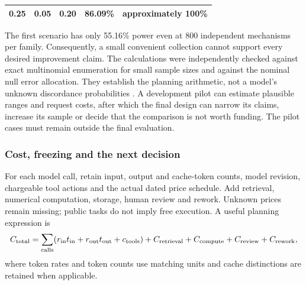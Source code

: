 \begin{longtable}[]{@{}lllll@{}}
\begin{minipage}[t]{0.17\columnwidth}\raggedright
0.25\strut
\end{minipage} & \begin{minipage}[t]{0.17\columnwidth}\raggedright
0.05\strut
\end{minipage} & \begin{minipage}[t]{0.17\columnwidth}\raggedright
0.20\strut
\end{minipage} & \begin{minipage}[t]{0.17\columnwidth}\raggedright
86.09\%\strut
\end{minipage} & \begin{minipage}[t]{0.17\columnwidth}\raggedright
approximately 100\%\strut
\end{minipage}\tabularnewline
\bottomrule
\end{longtable}

The first scenario has only 55.16\% power even at 800 independent
mechanisms per family. Consequently, a small convenient collection
cannot support every desired improvement claim. The calculations were
independently checked against exact multinomial enumeration for small
sample sizes and against the nominal null error allocation. They
establish the planning arithmetic, not a model's unknown discordance
probabilities \citep{exec13_live_planning}. A development pilot can
estimate plausible ranges and request costs, after which the final
design can narrow its claims, increase its sample or decide that the
comparison is not worth funding. The pilot cases must remain outside the
final evaluation.

\hypertarget{cost-freezing-and-the-next-decision}{%
\subsubsection{Cost, freezing and the next
decision}\label{cost-freezing-and-the-next-decision}}

For each model call, retain input, output and cache-token counts, model
revision, chargeable tool actions and the actual dated price schedule.
Add retrieval, numerical computation, storage, human review and rework.
Unknown prices remain missing; public tasks do not imply free execution.
A useful planning expression is \[
 C_{\rm total}=\sum_{\rm calls}
  (r_{\rm in}t_{\rm in}+r_{\rm out}t_{\rm out}+c_{\rm tools})
  +C_{\rm retrieval}+C_{\rm compute}+C_{\rm review}+C_{\rm rework},
\] where token rates and token counts use matching units and cache
distinctions are retained when applicable.

